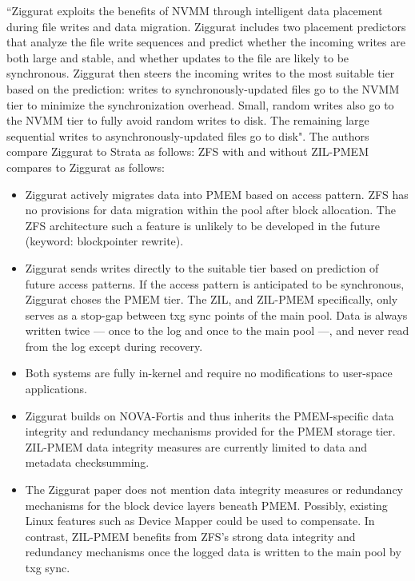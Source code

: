 \documentclass[12pt,a4paper,twoside]{book}
\begin{document}
``Ziggurat exploits the benefits of NVMM through intelligent data placement during file writes and data migration.
Ziggurat includes two placement predictors that analyze the file write sequences and predict whether the incoming writes are both large and stable, and whether updates to the file are likely to be synchronous.
Ziggurat then steers the incoming writes to the most suitable tier based on the prediction: writes to synchronously-updated files go to the NVMM tier to minimize the synchronization overhead.
Small, random writes also go to the NVMM tier to fully avoid random writes to disk. The remaining large sequential writes to asynchronously-updated files go to disk".
The authors compare Ziggurat to Strata as follows:
ZFS with and without ZIL-PMEM compares to Ziggurat as follows:
\begin{itemize}[noitemsep,beginpenalty=100000,midpenalty=100000]
    \item Ziggurat actively migrates data into PMEM based on access pattern.
          ZFS has no provisions for data migration within the pool after block allocation.
          The ZFS architecture such a feature is unlikely to be developed in the future (keyword: blockpointer rewrite).
    \item Ziggurat sends writes directly to the suitable tier based on prediction of future access patterns.
          If the access pattern is anticipated to be synchronous, Ziggurat choses the PMEM tier.
          The ZIL, and ZIL-PMEM specifically, only serves as a stop-gap between txg sync points of the main pool.
          Data is always written twice --- once to the log and once to the main pool ---, and never read from the log except during recovery.
    \item Both systems are fully in-kernel and require no modifications to user-space applications.
    \item Ziggurat builds on NOVA-Fortis and thus inherits the PMEM-specific data integrity and redundancy mechanisms provided for the PMEM storage tier.
          ZIL-PMEM data integrity measures are currently limited to data and metadata checksumming.
    \item The Ziggurat paper does not mention data integrity measures or redundancy mechanisms for the block device layers beneath PMEM.
          Possibly, existing Linux features such as Device Mapper could be used to compensate.
          In contrast, ZIL-PMEM benefits from ZFS’s strong data integrity and redundancy mechanisms once the logged data is written to the main pool by txg sync.

\end{itemize}
\end{document}
